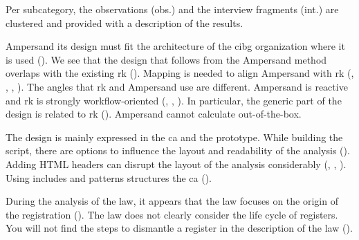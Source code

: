 Per subcategory, the observations (obs.) and the interview fragments (int.) are clustered and provided with a description of the results.
\label{s:4_1_architectural_fit}

Ampersand its design must fit the architecture of the \acrshort{cibg} organization where it is used ().
We see that the design that follows from the Ampersand method overlaps with the existing \acrlong{rk} ().
Mapping is needed to align Ampersand with \acrlong{rk} (, , , ).
The angles that \acrlong{rk} and Ampersand use are different.
Ampersand is reactive and \acrlong{rk} is strongly workflow-oriented (, , ).
In particular, the generic part of the design is related to \acrlong{rk} ().
Ampersand cannot calculate out-of-the-box.
\label{s:4_2_conceptual_analysis}

The design is mainly expressed in the \acrlong{ca} and the prototype.
While building the script, there are options to influence the layout and readability of the analysis ().
Adding HTML headers can disrupt the layout of the analysis considerably (, , ).
Using includes and patterns structures the \acrlong{ca} ().
\label{s:4_3_lifecycle_law}

During the analysis of the law, it appears that the law focuses on the origin of the registration ().
The law does not clearly consider the life cycle of registers.
You will not find the steps to dismantle a register in the description of the law ().
\label{s:4_4_register_unbundling}

